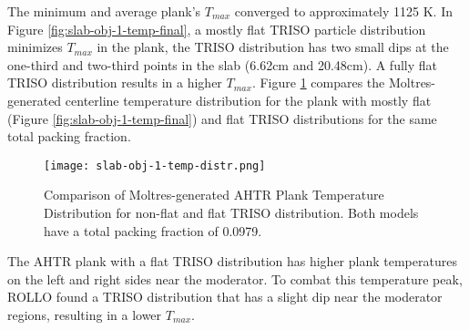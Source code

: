 The minimum and average plank's $T_{max}$ converged to approximately 
1125 K. 
In Figure \ref{fig:slab-obj-1-temp-final}, a mostly flat TRISO 
particle distribution minimizes $T_{max}$ in the plank, the TRISO distribution 
has two small dips at the one-third and two-third points in the slab (6.62cm and 20.48cm). 
A fully flat TRISO distribution results in a higher $T_{max}$.
Figure \ref{fig:slab-obj-1-temp-distr} compares the Moltres-generated centerline 
temperature distribution for the plank with mostly flat (Figure 
\ref{fig:slab-obj-1-temp-final}) and flat TRISO distributions for the same 
total packing fraction.
\begin{figure}[htbp]
    \centering
    \texttt{[image: slab-obj-1-temp-distr.png]}
    \caption{Comparison of Moltres-generated AHTR Plank Temperature Distribution for non-flat and flat
    TRISO distribution. Both models have a total packing fraction of 0.0979.}
    \label{fig:slab-obj-1-temp-distr}
\end{figure}
The AHTR plank with a flat TRISO distribution has higher plank temperatures 
on the left and right sides near the moderator. 
To combat this temperature peak, ROLLO found a TRISO distribution that 
has a slight dip near the moderator regions, resulting in a lower $T_{max}$.

